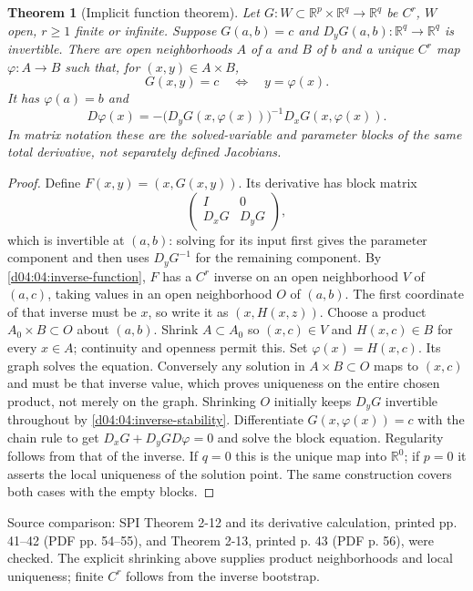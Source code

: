 \documentclass[11pt,oneside,openany]{book}
\newtheorem{theorem}{Theorem}[chapter]
\theoremstyle{definition}
\theoremstyle{remark}
\newcommand{\R}{\mathbb R}
\newcommand{\D}{\mathrm D}
\newcommand{\source}[1]{\par\begingroup\small\sffamily\color{black!65}Source comparison: #1\par\endgroup}
\begin{document}
\begin{theorem}[Implicit function theorem]\label{d04:04:implicit-function}
Let $G:W\subset\R^p\times\R^q\to\R^q$ be $C^r$, $W$ open,
$r\geq1$ finite or infinite. Suppose $G(a,b)=c$ and
$D_yG(a,b):\R^q\to\R^q$ is invertible. There are open neighborhoods
$A$ of $a$ and $B$ of $b$ and a unique $C^r$ map $\varphi:A\to B$
such that, for $(x,y)\in A\times B$,
\[
 G(x,y)=c\quad\Longleftrightarrow\quad y=\varphi(x).
\]
It has $\varphi(a)=b$ and
\[
 D\varphi(x)=-\big(D_yG(x,\varphi(x))\big)^{-1}
                         D_xG(x,\varphi(x)).
\]
In matrix notation these are the solved-variable and parameter blocks of
the same total derivative, not separately defined Jacobians.
\end{theorem}
\begin{proof}
Define $F(x,y)=(x,G(x,y))$. Its derivative has block matrix
\[
 \begin{pmatrix}I&0\\D_xG&D_yG\end{pmatrix},
\]
which is invertible at $(a,b)$: solving for its input first gives the
parameter component and then uses $D_yG^{-1}$ for the remaining component.
By \cref{d04:04:inverse-function}, $F$ has a $C^r$ inverse on an open
neighborhood $V$ of $(a,c)$, taking values in an open neighborhood $O$
of $(a,b)$. The first coordinate of that inverse must be $x$, so write
it as $(x,H(x,z))$. Choose a product $A_0\times B\subset O$ about
$(a,b)$. Shrink $A\subset A_0$ so $(x,c)\in V$ and $H(x,c)\in B$
for every $x\in A$; continuity and openness permit this. Set
$\varphi(x)=H(x,c)$. Its graph solves the equation. Conversely any solution
in $A\times B\subset O$ maps to $(x,c)$ and must be that inverse value,
which proves uniqueness on the entire chosen product, not merely on the
graph. Shrinking $O$ initially keeps $D_yG$ invertible throughout by
\cref{d04:04:inverse-stability}. Differentiate
$G(x,\varphi(x))=c$ with the chain rule to get
$D_xG+D_yG D\varphi=0$ and solve the block equation. Regularity follows
from that of the inverse. If $q=0$ this is the unique map into $\R^0$;
if $p=0$ it asserts the local uniqueness of the solution point. The same
construction covers both cases with the empty blocks.
\end{proof}
\source{SPI Theorem 2-12 and its derivative calculation, printed pp. 41--42
(PDF pp. 54--55), and Theorem 2-13, printed p. 43 (PDF p. 56), were
checked. The explicit shrinking above supplies product neighborhoods and
local uniqueness; finite $C^r$ follows from the inverse bootstrap.}
\end{document}
